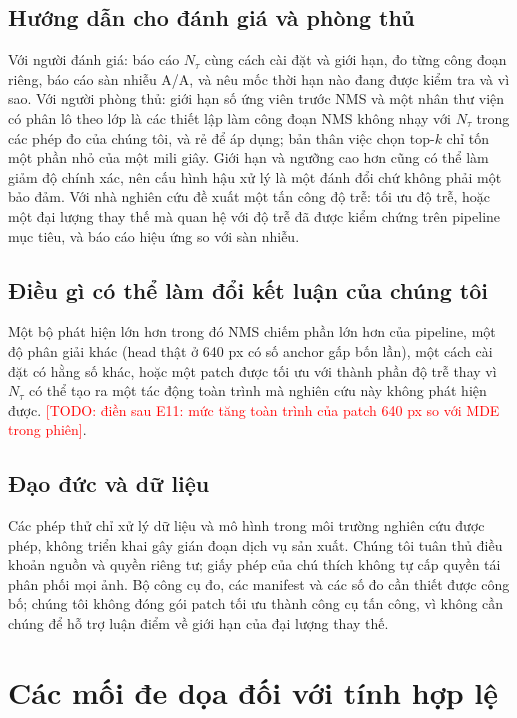 \documentclass[12pt,a4paper]{article}
\newcommand{\todo}[1]{\textcolor{red}{[TODO: #1]}}
\newcommand{\Ntau}{N_{\tau}}
\begin{document}
\subsection{Hướng dẫn cho đánh giá và phòng thủ}
Với người đánh giá: báo cáo $\Ntau$ cùng cách cài đặt và giới hạn, đo từng công đoạn riêng, báo cáo sàn nhiễu A/A, và nêu mốc thời hạn nào đang được kiểm tra và vì sao. Với người phòng thủ: giới hạn số ứng viên trước NMS và một nhân thư viện có phân lô theo lớp là các thiết lập làm công đoạn NMS không nhạy với $\Ntau$ trong các phép đo của chúng tôi, và rẻ để áp dụng; bản thân việc chọn top-$k$ chỉ tốn một phần nhỏ của một mili giây. Giới hạn và ngưỡng cao hơn cũng có thể làm giảm độ chính xác, nên cấu hình hậu xử lý là một đánh đổi chứ không phải một bảo đảm. Với nhà nghiên cứu đề xuất một tấn công độ trễ: tối ưu độ trễ, hoặc một đại lượng thay thế mà quan hệ với độ trễ đã được kiểm chứng trên pipeline mục tiêu, và báo cáo hiệu ứng so với sàn nhiễu.

\subsection{Điều gì có thể làm đổi kết luận của chúng tôi}
Một bộ phát hiện lớn hơn trong đó NMS chiếm phần lớn hơn của pipeline, một độ phân giải khác (head thật ở 640 px có số anchor gấp bốn lần), một cách cài đặt có hằng số khác, hoặc một patch được tối ưu với thành phần độ trễ thay vì $\Ntau$ có thể tạo ra một tác động toàn trình mà nghiên cứu này không phát hiện được. \todo{điền sau E11: mức tăng toàn trình của patch 640 px so với MDE trong phiên}.

\subsection{Đạo đức và dữ liệu}
Các phép thử chỉ xử lý dữ liệu và mô hình trong môi trường nghiên cứu được phép, không triển khai gây gián đoạn dịch vụ sản xuất. Chúng tôi tuân thủ điều khoản nguồn và quyền riêng tư; giấy phép của chú thích không tự cấp quyền tái phân phối mọi ảnh. Bộ công cụ đo, các manifest và các số đo cần thiết được công bố; chúng tôi không đóng gói patch tối ưu thành công cụ tấn công, vì không cần chúng để hỗ trợ luận điểm về giới hạn của đại lượng thay thế.

\section{Các mối đe dọa đối với tính hợp lệ}
\label{sec:threats}
\end{document}
